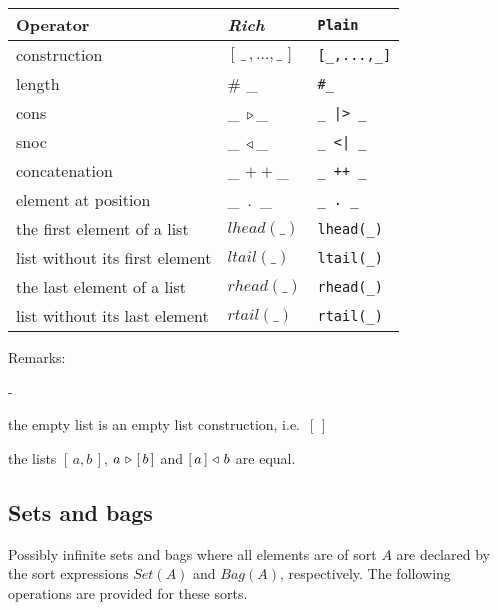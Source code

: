 \documentclass[a4paper,fleqn]{article}
\newenvironment{tdefinitions}[2][0.15em]
  {\begin{list}%
    {#2}%
    {\setlength{\parsep}{0pt}%
     \setlength{\itemsep}{#1}%
     \setlength{\leftmargin}{\mathindent}%
     \setlength{\labelwidth}{\mathindent - \labelsep}%
    }
  }
  {\end{list}}
\newcommand{\frm}[1]{\mbox{\ensuremath{#1}}}
\newcommand{\f}[1]{\ensuremath{\mathit{#1}}}
\newcommand{\fa}[2]{\ensuremath{\f{#1}(#2)}}
\newcommand{\lst}[1]{\ensuremath{[\,#1\,]}}
\newcommand{\el}{\ensuremath{[\,]}}
\newcommand{\cons}{\ensuremath{\hspace{0.12em}\triangleright\hspace{0.08em}}}
\newcommand{\snoc}{\ensuremath{\hspace{0.08em}\triangleleft\hspace{0.12em}}}
\newcommand{\concat}{\frm{+\!+}}
\newlength{\tlength}
\begin{document}
\bigskip
\begin{tabular}{|l@{\qquad}L@{\qquad}l|}
\hline
Operator                       & \textit{Rich}          & \verb+Plain+\\\hline
construction                   & \lst{\_\,,\ldots,\_}   & \verb+[_,...,_]+\\
length                         & \# \_                  & \verb+#_+\\
cons                           & \_ \cons \_            & \verb+_ |> _+\\
snoc                           & \_ \snoc \_            & \verb+_ <| _+\\
concatenation                  & \_ \concat \_          & \verb-_ ++ _-\\
element at position            & \_\ .\ \_                & \verb+_ . _+\\
the first element of a list    & \fa{lhead}{\_}         & \verb+lhead(_)+\\
list without its first element & \fa{ltail}{\_}         & \verb+ltail(_)+\\
the last element of a list     & \fa{rhead}{\_}         & \verb+rhead(_)+\\
list without its last element  & \fa{rtail}{\_}         & \verb+rtail(_)+\\
\hline
\end{tabular}\bigskip

\noindent
Remarks:
\begin{tdefinitions}{-}
\item the empty list is an empty list construction, i.e.\ \frm{\el}
\item the lists \frm{\lst{a,b}}, \frm{a \cons \lst{b}} and \frm{\lst{a} \snoc
b} are equal.
\end{tdefinitions}

\subsection{Sets and bags}

Possibly infinite sets and bags where all elements are of sort \frm{A} are
declared by the sort expressions \frm{\fa{Set}{A}} and \frm{\fa{Bag}{A}},
respectively. The following operations are provided for these sorts.
\end{document}
